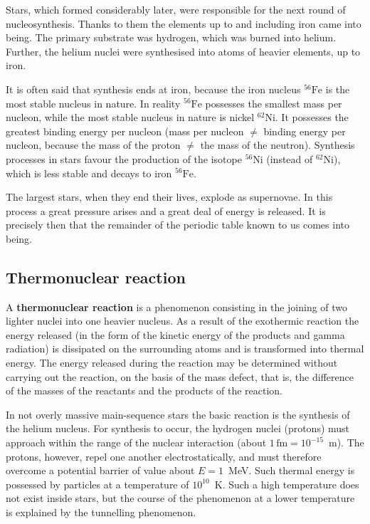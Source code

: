 Stars, which formed considerably later, were responsible for the next round of nucleosynthesis. Thanks to them the elements up to and including iron came into being. The primary substrate was hydrogen, which was burned into helium. Further, the helium nuclei were synthesised into atoms of heavier elements, up to iron.

It is often said that synthesis ends at iron, because the iron nucleus $^{56}\mathrm{Fe}$ is the most stable nucleus in nature. In reality $^{56}\mathrm{Fe}$ possesses the smallest mass per nucleon, while the most stable nucleus in nature is nickel $^{62}\mathrm{Ni}$. It possesses the greatest binding energy per nucleon (mass per nucleon $\neq$ binding energy per nucleon, because the mass of the proton $\neq$ the mass of the neutron). Synthesis processes in stars favour the production of the isotope $^{56}\mathrm{Ni}$ (instead of $^{62}\mathrm{Ni}$), which is less stable and decays to iron $^{56}\mathrm{Fe}$.

The largest stars, when they end their lives, explode as supernovae. In this process a great pressure arises and a great deal of energy is released. It is precisely then that the remainder of the periodic table known to us comes into being.

\subsection{Thermonuclear reaction}

A \textbf{thermonuclear reaction} is a phenomenon consisting in the joining of two lighter nuclei into one heavier nucleus. As a result of the exothermic reaction the energy released (in the form of the kinetic energy of the products and gamma radiation) is dissipated on the surrounding atoms and is transformed into thermal energy. The energy released during the reaction may be determined without carrying out the reaction, on the basis of the mass defect, that is, the difference of the masses of the reactants and the products of the reaction.

In not overly massive main-sequence stars the basic reaction is the synthesis of the helium nucleus. For synthesis to occur, the hydrogen nuclei (protons) must approach within the range of the nuclear interaction (about $1\,\mathrm{fm} = 10^{-15}$~m). The protons, however, repel one another electrostatically, and must therefore overcome a potential barrier of value about $E = 1$~MeV. Such thermal energy is possessed by particles at a temperature of $10^{10}$~K. Such a high temperature does not exist inside stars, but the course of the phenomenon at a lower temperature is explained by the tunnelling phenomenon.

